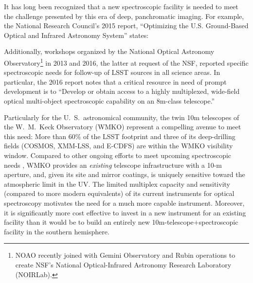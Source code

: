 \documentclass[11pt,a4paper,twoside,onecolumn,openany,final,oldfontcommands]{memoir}
\begin{document}
It has long been recognized that a new spectroscopic facility is needed to meet the challenge presented by this era of deep, panchromatic imaging. For example, the National Research Council's 2015 report, ``Optimizing the U.S. Ground-Based Optical and Infrared Astronomy System'' \citep{NAP21722} states:
%
\noindent{}
%
Additionally, workshops organized by the National Optical Astronomy Observatory\footnote{NOAO recently joined with Gemini Observatory and Rubin operations to create NSF's National Optical-Infrared Astronomy Research Laboratory (NOIRLab).} in 2013 and 2016, the latter at request of the NSF, reported specific spectroscopic needs for follow-up of LSST sources in all science areas.  In particular, the 2016 report notes that a critical resource in need of prompt development is to ``Develop or obtain access to a highly multiplexed, wide-field optical multi-object spectroscopic capability on an 8m-class telescope.''

Particularly for the U.~S.\ astronomical community, the twin 10m telescopes of the W.~M.~Keck Observatory (WMKO) represent a compelling avenue to meet this need:  More than 60\% of the LSST footprint and three of its deep-drilling fields (COSMOS, XMM-LSS, and E-CDFS) are within the WMKO visibility window.  Compared to other ongoing efforts to meet upcoming spectroscopic needs \citep{mega2019, mse2019, spectel2019}, WMKO provides an \textit{existing} telescope infrastructure with a 10-m aperture, and, given its site and mirror coatings, is uniquely sensitive toward the atmospheric limit in the UV.  The limited multiplex capacity and sensitivity (compared to more modern equivalents) of its current instruments for optical spectroscopy motivates the need for a much more capable instrument.  Moreover, it is significantly more cost effective to invest in a new instrument for an existing facility than it would be to build an entirely new 10m-telescope$+$spectroscopic facility in the southern hemisphere.
\end{document}
